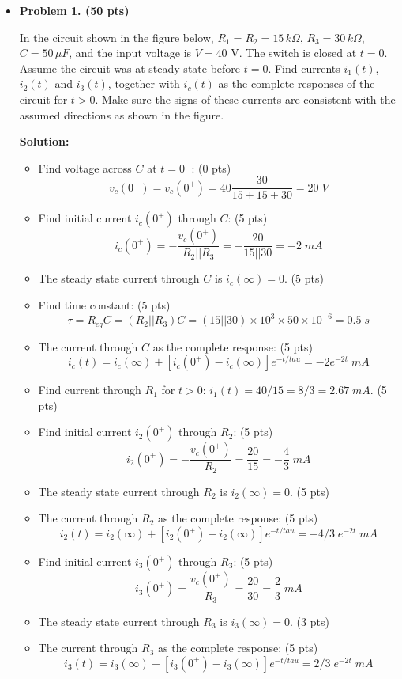 \begin{itemize}

\item {\bf Problem 1. (50 pts)}

In the circuit shown in the figure below, $R_1=R_2=15\,k\Omega$, $R_3=30\,k\Omega$,
$C=50\,\mu F$, and the input voltage is $V=40$ V. The switch is closed at $t=0$.
Assume the circuit was at steady state before $t=0$. Find currents $i_1(t)$, $i_2(t)$
and $i_3(t)$, together with $i_c(t)$ as the complete responses of the circuit for $t>0$.
Make sure the signs of these currents are consistent with the assumed directions as 
shown in the figure.


{\bf Solution:} 
\begin{itemize}
  \item Find voltage across $C$ at $t=0^-$: (0 pts)
    \[ v_c(0^-)=v_c(0^+)=40\frac{30}{15+15+30}=20\;V \]
  \item Find initial current $i_c(0^+)$ through $C$: (5 pts)
    \[ i_c(0^+)=-\frac{v_c(0^+)}{R_2 || R_3}=-\frac{20}{15 || 30}=-2\; mA \]
  \item The steady state current through $C$ is $i_c(\infty)=0$. (5 pts)
  \item Find time constant: (5 pts)
    \[ \tau=R_{eq}C=(R_2||R_3)C=(15||30)\times 10^3\times 50\times 10^{-6}=0.5\;s \]
  \item The current through $C$ as the complete response: (5 pts)
    \[ i_c(t)=i_c(\infty)+[i_c(0^+)-i_c(\infty)] e^{-t/tau}=-2 e^{-2t}\;mA \]

  \item Find current through $R_1$ for $t>0$: $i_1(t)=40/15=8/3=2.67\;mA$. (5 pts)

  \item Find initial current $i_2(0^+)$ through $R_2$: (5 pts)
    \[ i_2(0^+)=-\frac{v_c(0^+)}{R_2}=\frac{20}{15}=-\frac{4}{3}\;mA \]
  \item The steady state current through $R_2$ is $i_2(\infty)=0$. (5 pts)
  \item The current through $R_2$ as the complete response: (5 pts)
    \[ i_2(t)=i_2(\infty)+[i_2(0^+)-i_2(\infty)] e^{-t/tau}=-4/3 \; e^{-2t}\;mA \]

  \item Find initial current $i_3(0^+)$ through $R_3$: (5 pts)
    \[ i_3(0^+)=\frac{v_c(0^+)}{R_3}=\frac{20}{30}=\frac{2}{3}\;mA \]
  \item The steady state current through $R_3$ is $i_3(\infty)=0$. (3 pts)
  \item The current through $R_3$ as the complete response: (5 pts)
    \[ i_3(t)=i_3(\infty)+[i_3(0^+)-i_3(\infty)] e^{-t/tau}=2/3 \; e^{-2t}\;mA \]
\end{itemize}


\end{itemize}
